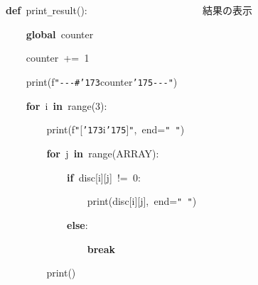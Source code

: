 \documentclass[a4paper,10pt]{article}
\def\mc{\relax}
\begin{document}
\noindent
\mbox{}\hfill

\noindent
\mbox{}\textbf{def}{\tt\mc \ }print{\tt\_}result():{\tt\mc \ }{\tt\mc \ }{\tt\mc \ }{\tt\mc \ }{\tt\mc \ }{\tt\mc \ }{\tt\mc \ }{\tt\mc \ }{\tt\mc \ }{\tt\mc \ }{\tt\mc \ }{\tt\mc \ }{\tt\mc \ }{\tt\mc \ }{\tt\mc \ }{\tt\mc \ }{\tt\mc \ }{\tt\mc \ }{\tt\mc \ }{\tt\mc \ }{\tt\mc \ }\rm\mc {\tt\#} \ 結果の表示 \hfill 
\tt\mc 

\noindent
\mbox{}{\tt\mc \ }{\tt\mc \ }{\tt\mc \ }{\tt\mc \ }\textbf{global}{\tt\mc \ }counter

\noindent
\mbox{}{\tt\mc \ }{\tt\mc \ }{\tt\mc \ }{\tt\mc \ }counter{\tt\mc \ }+={\tt\mc \ }1

\noindent
\mbox{}{\tt\mc \ }{\tt\mc \ }{\tt\mc \ }{\tt\mc \ }print(f{\tt "}{\tt -}{\tt -}{\tt -}{\tt\#}{\tt\char'173}counter{\tt\char'175}{\tt -}{\tt -}{\tt -}{\tt "})

\noindent
\mbox{}{\tt\mc \ }{\tt\mc \ }{\tt\mc \ }{\tt\mc \ }\textbf{for}{\tt\mc \ }i{\tt\mc \ }\textbf{in}{\tt\mc \ }range(3):

\noindent
\mbox{}{\tt\mc \ }{\tt\mc \ }{\tt\mc \ }{\tt\mc \ }{\tt\mc \ }{\tt\mc \ }{\tt\mc \ }{\tt\mc \ }print(f{\tt "}[{\tt\char'173}i{\tt\char'175}]{\tt "},{\tt\mc \ }end={\tt "}{\tt\mc \ }{\tt "})

\noindent
\mbox{}{\tt\mc \ }{\tt\mc \ }{\tt\mc \ }{\tt\mc \ }{\tt\mc \ }{\tt\mc \ }{\tt\mc \ }{\tt\mc \ }\textbf{for}{\tt\mc \ }j{\tt\mc \ }\textbf{in}{\tt\mc \ }range(ARRAY):

\noindent
\mbox{}{\tt\mc \ }{\tt\mc \ }{\tt\mc \ }{\tt\mc \ }{\tt\mc \ }{\tt\mc \ }{\tt\mc \ }{\tt\mc \ }{\tt\mc \ }{\tt\mc \ }{\tt\mc \ }{\tt\mc \ }\textbf{if}{\tt\mc \ }disc[i][j]{\tt\mc \ }!={\tt\mc \ }0:

\noindent
\mbox{}{\tt\mc \ }{\tt\mc \ }{\tt\mc \ }{\tt\mc \ }{\tt\mc \ }{\tt\mc \ }{\tt\mc \ }{\tt\mc \ }{\tt\mc \ }{\tt\mc \ }{\tt\mc \ }{\tt\mc \ }{\tt\mc \ }{\tt\mc \ }{\tt\mc \ }{\tt\mc \ }print(disc[i][j],{\tt\mc \ }end={\tt "}{\tt\mc \ }{\tt "})

\noindent
\mbox{}{\tt\mc \ }{\tt\mc \ }{\tt\mc \ }{\tt\mc \ }{\tt\mc \ }{\tt\mc \ }{\tt\mc \ }{\tt\mc \ }{\tt\mc \ }{\tt\mc \ }{\tt\mc \ }{\tt\mc \ }\textbf{else}:

\noindent
\mbox{}{\tt\mc \ }{\tt\mc \ }{\tt\mc \ }{\tt\mc \ }{\tt\mc \ }{\tt\mc \ }{\tt\mc \ }{\tt\mc \ }{\tt\mc \ }{\tt\mc \ }{\tt\mc \ }{\tt\mc \ }{\tt\mc \ }{\tt\mc \ }{\tt\mc \ }{\tt\mc \ }\textbf{break}

\noindent
\mbox{}{\tt\mc \ }{\tt\mc \ }{\tt\mc \ }{\tt\mc \ }{\tt\mc \ }{\tt\mc \ }{\tt\mc \ }{\tt\mc \ }print()
\end{document}
